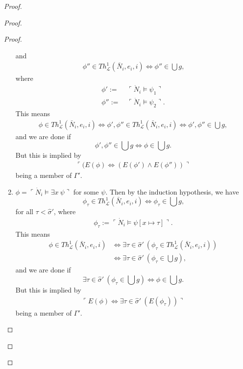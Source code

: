 \documentclass[12pt, twoside]{memoir}
\numberwithin{equation}{section}
\theoremstyle{definition}
\theoremstyle{remark}
\theoremstyle{definition}
\theoremstyle{definition}
\theoremstyle{definition}
\theoremstyle{remark}
\begin{document}
\begin{proof}
\begin{proof}
\begin{proof}
\begin{enumerate}[label=Case \arabic*:, leftmargin=50pt]
    and
    \begin{align*}
        \phi'' \in Th^{1}_{\mathcal{L}}(\bar{N}_i, e_i, i) \iff \phi'' \in \bigcup g \text{,} 
    \end{align*}
    where
    \begin{align*}
        \phi' := \ & \ulcorner \dot{N}_i \models \psi_1 \urcorner \\
        \phi'' := \ & \ulcorner \dot{N}_i \models \psi_2 \urcorner \text{.}
    \end{align*}
    This means  
    \begin{align*}
        \phi \in Th^{1}_{\mathcal{L}}(\bar{N}_i, e_i, i) \iff \phi', \phi'' \in Th^{1}_{\mathcal{L}}(\bar{N}_i, e_i, i) \iff \phi', \phi'' \in \bigcup g,
    \end{align*}
    and we are done if 
    \begin{equation*}
        \phi', \phi'' \in \bigcup g \iff \phi \in \bigcup g \text{.}
    \end{equation*}
    But this is implied by
    \begin{align*}
        \ulcorner (E(\phi) \iff (E(\phi') \wedge E(\phi'')) \urcorner
    \end{align*}
    being a member of $\Gamma'$.
    \item $\phi = \ulcorner \dot{N}_i \models \exists x \ \psi \urcorner$ for some $\psi$. Then by the induction hypothesis, we have 
    \begin{equation*}
        \phi_{\tau} \in Th^{1}_{\mathcal{L}}(\bar{N}_i, e_i, i) \iff \phi_{\tau} \in \bigcup g \text{,}
    \end{equation*} 
    for all $\tau < \hat{\sigma}'$, where
    \begin{align*}
        \phi_{\tau} := \ulcorner \dot{N}_i \models \psi[x \mapsto \tau] \urcorner \text{.}
    \end{align*}
    This means 
    \begin{align*}
        \phi \in Th^{1}_{\mathcal{L}}(\bar{N}_i, e_i, i) & \iff \exists \tau \in \hat{\sigma}' \ (\phi_{\tau} \in Th^{1}_{\mathcal{L}}(\bar{N}_i, e_i, i)) \\
        & \iff \exists \tau \in \hat{\sigma}' \ (\phi_{\tau} \in \bigcup g) \text{,}
    \end{align*}
    and we are done if 
    \begin{equation*}
        \exists \tau \in \hat{\sigma}' \ (\phi_{\tau} \in \bigcup g) \iff \phi \in \bigcup g \text{.}
    \end{equation*} 
    But this is implied by  
    \begin{align*}
        \ulcorner E(\phi) \iff \exists \tau \in \hat{\sigma}' \ (E(\phi_{\tau})) \urcorner
    \end{align*}
    being a member of $\Gamma'$. \qedhere
\end{enumerate}
\end{proof}


\end{proof}
\end{proof}
\end{document}
